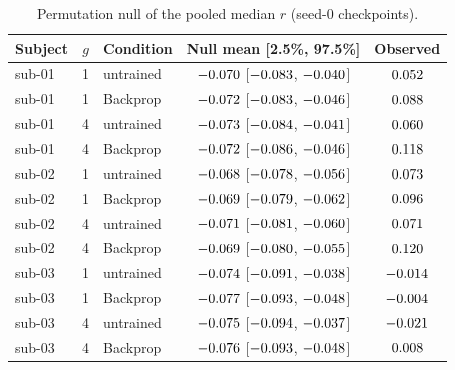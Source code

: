 \begin{table}[H]
\centering
\footnotesize
\setlength{\tabcolsep}{3pt}
\begin{tabular}{@{}lclcc@{}}
\toprule
Subject & $g$ & Condition & Null mean [2.5\%, 97.5\%] & Observed \\
\midrule
sub-01 & 1 & untrained & $-0.070$ [$-0.083$, $-0.040$] & $0.052$ \\
sub-01 & 1 & Backprop & $-0.072$ [$-0.083$, $-0.046$] & $0.088$ \\
sub-01 & 4 & untrained & $-0.073$ [$-0.084$, $-0.041$] & $0.060$ \\
sub-01 & 4 & Backprop & $-0.072$ [$-0.086$, $-0.046$] & $0.118$ \\
sub-02 & 1 & untrained & $-0.068$ [$-0.078$, $-0.056$] & $0.073$ \\
sub-02 & 1 & Backprop & $-0.069$ [$-0.079$, $-0.062$] & $0.096$ \\
sub-02 & 4 & untrained & $-0.071$ [$-0.081$, $-0.060$] & $0.071$ \\
sub-02 & 4 & Backprop & $-0.069$ [$-0.080$, $-0.055$] & $0.120$ \\
sub-03 & 1 & untrained & $-0.074$ [$-0.091$, $-0.038$] & $-0.014$ \\
sub-03 & 1 & Backprop & $-0.077$ [$-0.093$, $-0.048$] & $-0.004$ \\
sub-03 & 4 & untrained & $-0.075$ [$-0.094$, $-0.037$] & $-0.021$ \\
sub-03 & 4 & Backprop & $-0.076$ [$-0.093$, $-0.048$] & $0.008$ \\
\bottomrule
\end{tabular}
\caption{Permutation null of the pooled median $r$ (seed-0 checkpoints).}
\label{tab:permnull}
\end{table}

